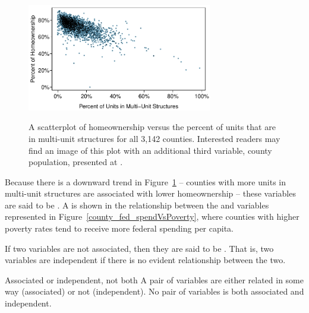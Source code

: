 \begin{figure}
   \centering
 \href{\oiRedirectUrl{tableau_scatter_homeownership}}{ \includegraphics[width=0.72\textwidth]{ch_data_collection/figures/multiunitsVsOwnership/multiunitsVsOwnership}}
   \caption{A scatterplot of homeownership versus the percent of units that are in multi-unit structures for all 3,142 counties. Interested readers may find an image of this plot with an additional third variable, county population, presented at .}
   \label{multiunitsVsOwnership}
\end{figure}

Because there is a downward trend in Figure~\ref{multiunitsVsOwnership} -- counties with more units in multi-unit structures are associated with lower homeownership -- these variables are said to be . A  is shown in the relationship between the  and  variables represented in Figure~\ref{county_fed_spendVsPoverty}, where counties with higher poverty rates tend to receive more federal spending per capita.

If two variables are not associated, then they are said to be . That is, two variables are independent if there is no evident relationship between the two.

\begin{onebox}{Associated or independent, not both}
A pair of variables are either related in some way (associated) or not (independent). No pair of variables is both associated and independent.\end{onebox}




